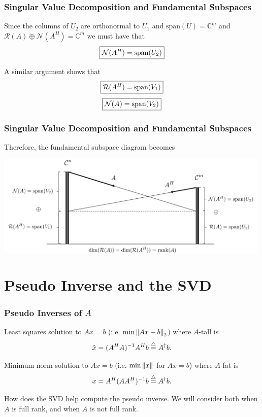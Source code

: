 \documentclass{beamer}
\begin{document}
\begin{frame}\frametitle{Singular Value Decomposition and Fundamental Subspaces}
	Since the columns of 
	$U_2$ 
	are orthonormal to 
	$U_1$ and 
	$\text{span}(U) = \mathbb{C}^m$ 
	and 
	$\mathcal{R}(A) \oplus \mathcal{N}(A^H) = \mathbb{C}^m$ 
	we must have that
	\[
		\fbox{$\mathcal{N}(A^H) = \text{span}(U_2)$}
	\]
	
	A similar argument shows that
	\[
		\fbox{$\mathcal{R}(A^H) = \text{span}(V_1)$}
	\]
	\[
		\fbox{$\mathcal{N}(A) = \text{span}(V_2)$}
	\]	
\end{frame}

\begin{frame}\frametitle{Singular Value Decomposition and Fundamental Subspaces}

	Therefore, the fundamental subspace diagram becomes
	\begin{center}
		\includegraphics[width=0.99\textwidth]
			{figures/chap7_fundamental_subspace_3}	
	\end{center}
\end{frame}


\section{Pseudo Inverse and the SVD}
\frame{\sectionpage}

\begin{frame}\frametitle{Pseudo Inverses of $A$}
	Least squares solution to $Ax=b$ (i.e. $\min\left\|Ax-b\right\|_2$) where $A$-tall is
	\[ 
		\hat{x} = (A^H A)^{-1} A^H b \stackrel{\triangle}{=} A^\dagger b.
	\]
	
	\vfill
	
	Minimum norm solution to $Ax = b$ (i.e. $\min\left\|x\right\|$ for $Ax=b$) where $A$-fat is
	\[
		x = A^H (A A^H)^{-1} b \stackrel{\triangle}{=} A^\dagger b. 
	\]
	
	\vfill
	
	How does the SVD help compute the pseudo inverse.  We will consider both when $A$ is full rank, and when $A$ is not full rank.
\end{frame}
\end{document}
